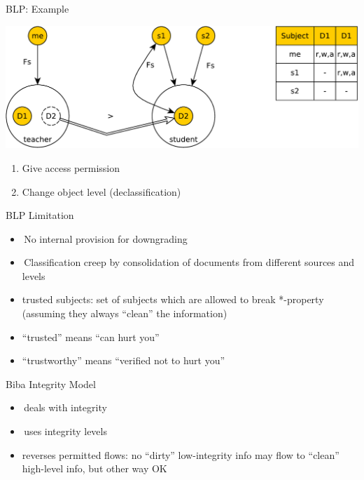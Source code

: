 \documentclass{beamer}
\begin{document}
\begin{frame}[t]{BLP: Example}
  \begin{center}
    \includegraphics[width=0.8\linewidth]{ex12}
  \end{center}
\begin{enumerate}
  \item Give access permission
  \item Change object level (declassification)
\end{enumerate}
\end{frame}

\begin{frame}{BLP Limitation}
  \begin{itemize}
    \item No internal provision for downgrading
    \item Classification creep by consolidation of 
      documents from different sources and levels
    \item \alert{trusted subjects}: set of subjects which are 
      allowed to break *-property (assuming they always 
      ``clean'' the information)
    \item ``trusted''  means ``can hurt you''
    \item ``trustworthy'' means ``verified not to hurt you''
  \end{itemize}
\end{frame}

\begin{frame}{Biba Integrity Model}
  \begin{itemize}
    \item deals with integrity
    \item uses integrity levels
    \item reverses permitted flows: 
      no ``dirty'' low-integrity info may flow to ``clean'' 
      high-level info, but other way OK
  \end{itemize}
\end{frame}
\end{document}
